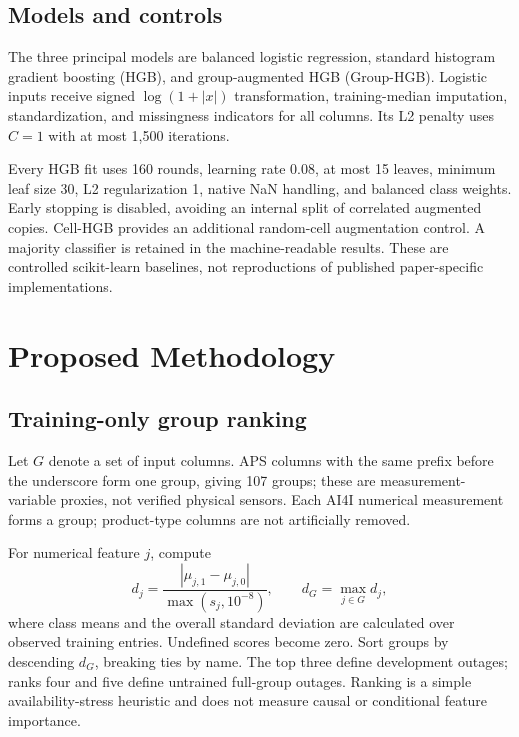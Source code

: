 \documentclass[conference]{IEEEtran}
\begin{document}
\subsection{Models and controls}
The three principal models are balanced logistic regression, standard histogram gradient boosting (HGB), and group-augmented HGB (Group-HGB). Logistic inputs receive signed $\log(1+|x|)$ transformation, training-median imputation, standardization, and missingness indicators for all columns. Its L2 penalty uses $C=1$ with at most 1,500 iterations.

Every HGB fit uses 160 rounds, learning rate 0.08, at most 15 leaves, minimum leaf size 30, L2 regularization 1, native NaN handling, and balanced class weights. Early stopping is disabled, avoiding an internal split of correlated augmented copies. Cell-HGB provides an additional random-cell augmentation control. A majority classifier is retained in the machine-readable results. These are controlled scikit-learn baselines, not reproductions of published paper-specific implementations.

\section{Proposed Methodology}
\subsection{Training-only group ranking}
Let $G$ denote a set of input columns. APS columns with the same prefix before the underscore form one group, giving 107 groups; these are measurement-variable proxies, not verified physical sensors. Each AI4I numerical measurement forms a group; product-type columns are not artificially removed.

For numerical feature $j$, compute
\begin{equation}
 d_j=\frac{|\mu_{j,1}-\mu_{j,0}|}{\max(s_j,10^{-8})},\qquad d_G=\max_{j\in G} d_j,
\end{equation}
where class means and the overall standard deviation are calculated over observed training entries. Undefined scores become zero. Sort groups by descending $d_G$, breaking ties by name. The top three define development outages; ranks four and five define untrained full-group outages. Ranking is a simple availability-stress heuristic and does not measure causal or conditional feature importance.
\end{document}

